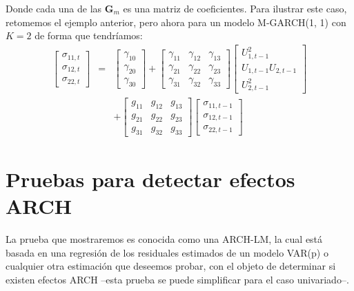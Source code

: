 \documentclass[
]{book}
\begin{document}
Donde cada una de las \(\mathbf{G}_m\) es una matriz de coeficientes. Para ilustrar este caso, retomemos el ejemplo anterior, pero ahora para un modelo M-GARCH(1, 1) con \(K = 2\) de forma que tendríamos:
\begin{eqnarray*}
    \begin{bmatrix}
    \sigma_{11, t} \\ \sigma_{12, t} \\ \sigma_{22, t}
    \end{bmatrix} & = &
    \begin{bmatrix}
    \gamma_{10} \\ \gamma_{20} \\ \gamma_{30}
    \end{bmatrix} +
    \begin{bmatrix}
    \gamma_{11} & \gamma_{12} & \gamma_{13} \\ \gamma_{21} & \gamma_{22} & \gamma_{23} \\ \gamma_{31} & \gamma_{32} & \gamma_{33}
    \end{bmatrix} 
    \begin{bmatrix}
    U^2_{1, t-1} \\ U_{1, t-1} U_{2, t-1} \\ U^2_{2, t-1}
    \end{bmatrix} \\
    & & + 
    \begin{bmatrix}
    g_{11} & g_{12} & g_{13} \\ g_{21} & g_{22} & g_{23} \\ g_{31} & g_{32} & g_{33}
    \end{bmatrix} 
    \begin{bmatrix}
    \sigma_{11, t-1} \\ \sigma_{12, t-1} \\ \sigma_{22, t-1}
    \end{bmatrix}
\end{eqnarray*}

\hypertarget{pruebas-para-detectar-efectos-arch}{%
\section{Pruebas para detectar efectos ARCH}\label{pruebas-para-detectar-efectos-arch}}

La prueba que mostraremos es conocida como una ARCH-LM, la cual está basada en una regresión de los residuales estimados de un modelo VAR(p) o cualquier otra estimación que deseemos probar, con el objeto de determinar si existen efectos ARCH --esta prueba se puede simplificar para el caso univariado--.
\end{document}
